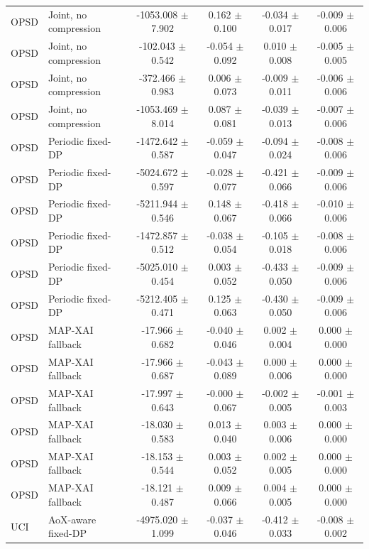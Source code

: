 \begin{table}[t]
\begin{tabular}{llcccc}
OPSD & Joint, no compression & -1053.008 $\pm$ 7.902 & 0.162 $\pm$ 0.100 & -0.034 $\pm$ 0.017 & -0.009 $\pm$ 0.006 \\
OPSD & Joint, no compression & -102.043 $\pm$ 0.542 & -0.054 $\pm$ 0.092 & 0.010 $\pm$ 0.008 & -0.005 $\pm$ 0.005 \\
OPSD & Joint, no compression & -372.466 $\pm$ 0.983 & 0.006 $\pm$ 0.073 & -0.009 $\pm$ 0.011 & -0.006 $\pm$ 0.006 \\
OPSD & Joint, no compression & -1053.469 $\pm$ 8.014 & 0.087 $\pm$ 0.081 & -0.039 $\pm$ 0.013 & -0.007 $\pm$ 0.006 \\
OPSD & Periodic fixed-DP & -1472.642 $\pm$ 0.587 & -0.059 $\pm$ 0.047 & -0.094 $\pm$ 0.024 & -0.008 $\pm$ 0.006 \\
OPSD & Periodic fixed-DP & -5024.672 $\pm$ 0.597 & -0.028 $\pm$ 0.077 & -0.421 $\pm$ 0.066 & -0.009 $\pm$ 0.006 \\
OPSD & Periodic fixed-DP & -5211.944 $\pm$ 0.546 & 0.148 $\pm$ 0.067 & -0.418 $\pm$ 0.066 & -0.010 $\pm$ 0.006 \\
OPSD & Periodic fixed-DP & -1472.857 $\pm$ 0.512 & -0.038 $\pm$ 0.054 & -0.105 $\pm$ 0.018 & -0.008 $\pm$ 0.006 \\
OPSD & Periodic fixed-DP & -5025.010 $\pm$ 0.454 & 0.003 $\pm$ 0.052 & -0.433 $\pm$ 0.050 & -0.009 $\pm$ 0.006 \\
OPSD & Periodic fixed-DP & -5212.405 $\pm$ 0.471 & 0.125 $\pm$ 0.063 & -0.430 $\pm$ 0.050 & -0.009 $\pm$ 0.006 \\
OPSD & MAP-XAI fallback & -17.966 $\pm$ 0.682 & -0.040 $\pm$ 0.046 & 0.002 $\pm$ 0.004 & 0.000 $\pm$ 0.000 \\
OPSD & MAP-XAI fallback & -17.966 $\pm$ 0.687 & -0.043 $\pm$ 0.089 & 0.000 $\pm$ 0.006 & 0.000 $\pm$ 0.000 \\
OPSD & MAP-XAI fallback & -17.997 $\pm$ 0.643 & -0.000 $\pm$ 0.067 & -0.002 $\pm$ 0.005 & -0.001 $\pm$ 0.003 \\
OPSD & MAP-XAI fallback & -18.030 $\pm$ 0.583 & 0.013 $\pm$ 0.040 & 0.003 $\pm$ 0.006 & 0.000 $\pm$ 0.000 \\
OPSD & MAP-XAI fallback & -18.153 $\pm$ 0.544 & 0.003 $\pm$ 0.052 & 0.002 $\pm$ 0.005 & 0.000 $\pm$ 0.000 \\
OPSD & MAP-XAI fallback & -18.121 $\pm$ 0.487 & 0.009 $\pm$ 0.066 & 0.004 $\pm$ 0.005 & 0.000 $\pm$ 0.000 \\
UCI & AoX-aware fixed-DP & -4975.020 $\pm$ 1.099 & -0.037 $\pm$ 0.046 & -0.412 $\pm$ 0.033 & -0.008 $\pm$ 0.002 \\

\end{tabular}
\end{table}
